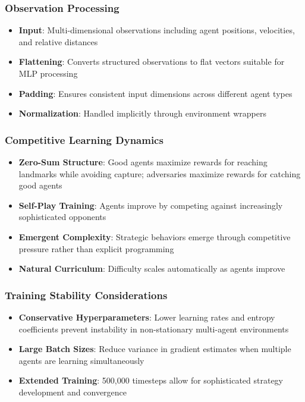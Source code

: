 \subsubsection{Observation Processing}
\begin{itemize}
    \item \textbf{Input}: Multi-dimensional observations including agent positions, velocities, and relative distances
    \item \textbf{Flattening}: Converts structured observations to flat vectors suitable for MLP processing
    \item \textbf{Padding}: Ensures consistent input dimensions across different agent types
    \item \textbf{Normalization}: Handled implicitly through environment wrappers
\end{itemize}

\subsubsection{Competitive Learning Dynamics}
\begin{itemize}
    \item \textbf{Zero-Sum Structure}: Good agents maximize rewards for reaching landmarks while avoiding capture; adversaries maximize rewards for catching good agents
    \item \textbf{Self-Play Training}: Agents improve by competing against increasingly sophisticated opponents
    \item \textbf{Emergent Complexity}: Strategic behaviors emerge through competitive pressure rather than explicit programming
    \item \textbf{Natural Curriculum}: Difficulty scales automatically as agents improve
\end{itemize}

\subsubsection{Training Stability Considerations}
\begin{itemize}
    \item \textbf{Conservative Hyperparameters}: Lower learning rates and entropy coefficients prevent instability in non-stationary multi-agent environments
    \item \textbf{Large Batch Sizes}: Reduce variance in gradient estimates when multiple agents are learning simultaneously
    \item \textbf{Extended Training}: 500,000 timesteps allow for sophisticated strategy development and convergence
\end{itemize}


